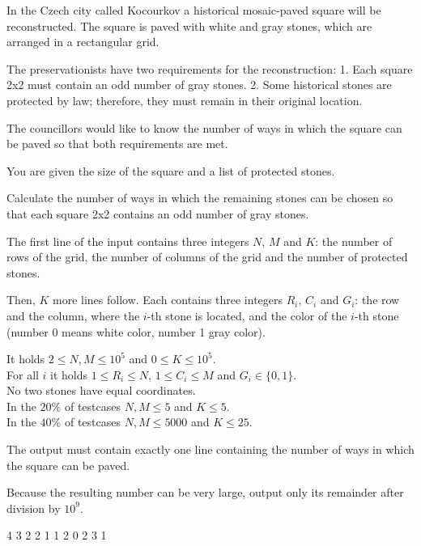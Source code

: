 





In the Czech city called Kocourkov a historical mosaic-paved square will be reconstructed.
The square is paved with white and gray stones, which are arranged in a rectangular grid.

The preservationists have two requirements for the reconstruction:
1. Each square 2x2 must contain an odd number of gray stones.
2. Some historical stones are protected by law; therefore, they must remain in their original location.

The councillors would like to know the number of ways in which the square can be paved so that both requirements are met.


You are given the size of the square and a list of protected stones.

Calculate the number of ways in which the remaining stones can be chosen so that each square 2x2 contains an odd number of gray stones.


The first line of the input contains three integers $N$, $M$ and $K$: the number of rows of the grid, the number of columns of the grid and the number of protected stones.

Then, $K$ more lines follow. Each contains three integers $R_i$, $C_i$ and $G_i$: the row and the column, where the $i$-th stone is located, and the color of the $i$-th stone (number 0 means white color, number 1 gray color).

\bigskip
\noindent
It holds $2 \leq N,M \leq 10^5$ and $0 \leq K \leq 10^5$.\\
For all $i$ it holds $1 \leq R_i \leq N$, $1 \leq C_i \leq M$ and $G_i \in \{ 0, 1 \}$.\\
No two stones have equal coordinates.\\
In the $20\%$ of testcases $N,M \leq 5$ and $K \leq 5$.\\
In the $40\%$ of testcases $N,M \leq 5000$ and $K \leq 25$.


The output must contain exactly one line containing the number of ways in which the square can be paved.

Because the resulting number can be very large, output only its remainder after division by $10^9$.


 4 3
2 2 1
1 2 0
2 3 1
\sampleEND


